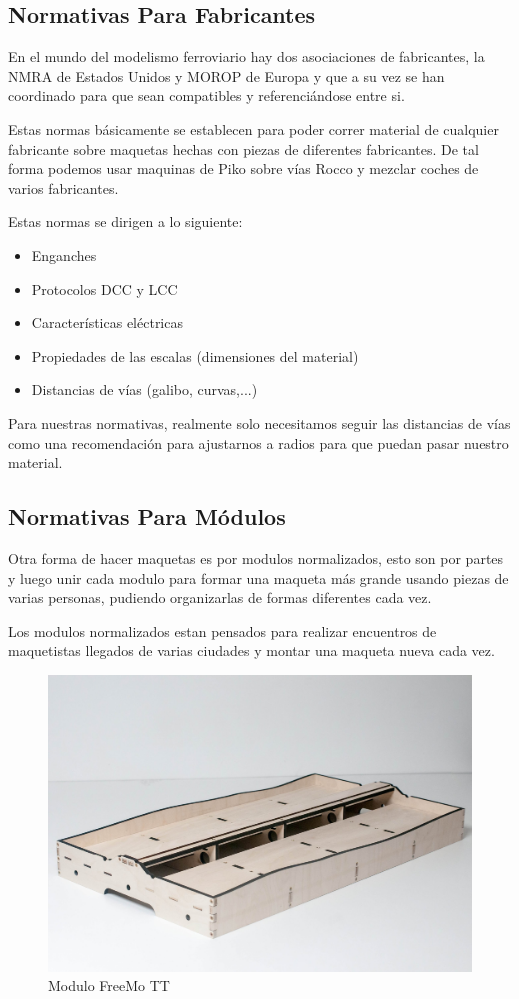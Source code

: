\subsection{Normativas Para Fabricantes}
En el mundo del modelismo ferroviario hay dos asociaciones de fabricantes, la NMRA de Estados Unidos y MOROP de Europa y que a su vez se han coordinado para que sean compatibles y referenciándose entre si.

Estas normas básicamente se establecen para poder correr material de cualquier fabricante sobre maquetas hechas con piezas de diferentes fabricantes. De tal forma podemos usar maquinas de Piko sobre vías Rocco y mezclar coches de varios fabricantes.

Estas normas se dirigen a lo siguiente:
\begin{itemize}
	\item Enganches
	\item Protocolos DCC y LCC
	\item Características eléctricas
	\item Propiedades de las escalas (dimensiones del material)
	\item Distancias de vías (galibo, curvas,...)
\end{itemize}
Para nuestras normativas, realmente solo necesitamos seguir las distancias de vías como una recomendación para ajustarnos a radios para que puedan pasar nuestro material.
\subsection{Normativas Para Módulos}
Otra forma de hacer maquetas es por modulos normalizados, esto son por partes y luego unir cada modulo para formar una maqueta más grande usando piezas de varias personas, pudiendo organizarlas de formas diferentes cada vez.

Los modulos normalizados estan pensados para realizar encuentros de maquetistas llegados de varias ciudades y montar una maqueta nueva cada vez.

\begin{figure}[h]
	\centering\includegraphics[scale=1]{chapters/0X_Normativas_01_Intro/IMG_0017.JPG}
	\caption{Modulo FreeMo TT}
	\label{fig:modulott}
\end{figure}


